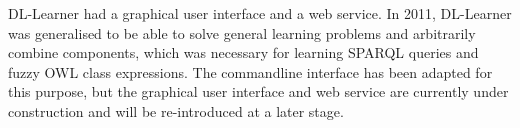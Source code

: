 \documentclass[a4paper,12pt]{scrartcl}
\begin{document}

DL-Learner had a graphical user interface and a web service. In 2011, DL-Learner was generalised to be able to solve general learning problems and arbitrarily combine components, which was necessary for learning SPARQL queries and fuzzy OWL class expressions. The commandline interface has been adapted for this purpose, but the graphical user interface and web service are currently under construction and will be re-introduced at a later stage.



\end{document}
